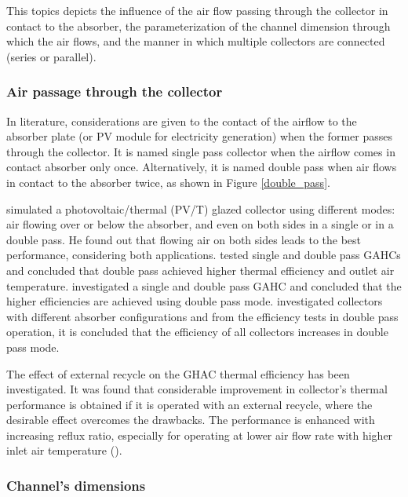 This topics depicts the influence of the air flow passing through the collector in contact to the absorber, the parameterization of the channel dimension through which the air flows, and the manner in which multiple collectors are connected (series or parallel).

\subsubsection{Air passage through the collector}

In literature, considerations are given to the contact of the airflow to the absorber plate (or PV module for electricity generation) when the former passes through the collector. It is named single pass collector when the airflow comes in contact absorber only once. Alternatively, it is named double pass when air flows in contact to the absorber twice, as shown in Figure \ref{double_pass}. 


\citet{Hegazy2000} simulated a photovoltaic/thermal (PV/T) glazed collector using different modes: air flowing over or below the absorber, and even on both sides in a single or in a double pass. He found out that flowing air on both sides leads to the best performance, considering both applications. \citet{Yousef2008} tested single and double pass GAHCs and concluded that double pass achieved higher thermal efficiency and outlet air temperature. \citet{Nowzari2015} investigated a single and double pass GAHC and concluded that the higher efficiencies are achieved using double pass mode. \citet{Karim2004} investigated collectors with different absorber configurations and from the efficiency tests in double pass operation, it is concluded that the efficiency of all collectors increases in double pass mode.

The effect of external recycle on the GHAC thermal efficiency has been investigated. It was found that considerable improvement in collector's thermal performance is obtained if it is operated with an external recycle, where the desirable effect overcomes the drawbacks. The performance is enhanced with increasing reflux ratio, especially for operating at lower air flow rate with higher inlet air temperature (\cite{Yeh2009}).

\subsubsection{Channel's dimensions}


